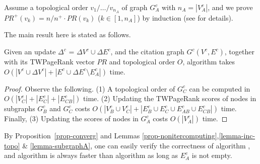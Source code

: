 {\begin{proofSketch}
Assume a topological order $v_1/\dots/v_{n_A}$ of graph $G^c_A$ with $n_A=|V^c_A|$, and
we prove $PR^+(v_k)={n}/{n^+} \cdot PR(v_k)$ ($k\in [1,n_A]$) by induction (see \cite{ERank-full} for details).
\end{proofSketch}



The main result here is stated as follows.


\begin{theorem} \label{lemma-inc-citation-comp}
Given an update $\Delta^c$ = $\Delta V^c\cup\Delta E^c$, and the citation graph $G^c(V^c,E^c)$, together with its TWPageRank vector $PR$ and topological order $O$, algorithm \inctwprdag takes $O(|V^c\cup\Delta V^c|+ |E^c\cup\Delta E^c\setminus E^c_A|)$ time.
\end{theorem}

\begin{proof}
Observe the following. (1) A topological order of $G^c_C$ can be computed in $O(|V^c_C|+|E^c_C|+|E^c_{CB}|)$ time. %
(2) Updating the TWPageRank scores of nodes in subgraphs $G^c_B$ and $G^c_C$ costs $O(|V^c_B\cup V^c_C|+|E^c_B\cup E^c_C\cup E^c_{AB}\cup E^c_{CB}|)$ time. Finally, (3) Updating the scores of nodes in $G^c_A$ costs $O(|V^c_A|)$ time.
\end{proof}


By Proposition~\ref{prop-converg} and Lemmas \ref{prop-nonitercomputing},\ref{lemma-inc-topo} \& \ref{lemma-subgraphA}, one can easily verify the correctness of algorithm \inctwprdag, and algorithm \inctwprdag is always faster than algorithm \twprdag as long as $E^c_A$ is not empty.


}
